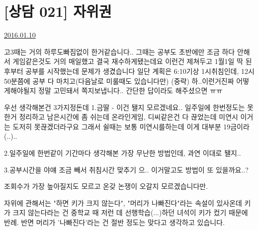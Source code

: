 \section{[상담 021] 자위권}
\href{https://www.kockoc.com/Apoc/583606}{2016.01.10}

\vspace{5mm}

고3때는 거의 하루도빠짐없이 한거같습니다.. 그때는 공부도 초반에만 조금 하다 안해서
게임같은것도 거의 매일했고 결국 재수하게됐는데요
이런건 제쳐두고 1월1일 딱 된 후부터 공부를 시작했는데 문제가 생겼습니다
일단 계획은 6:10기상 1시취침인데, 12시 50분쯤에 공부 다 마치고(다음날로 미룰때도 있습니다만)
(중략)
하..이런거진짜 어떻게해야될지 정말 고민돼서 쪽지보냅니다.. 간단한 답이라도 해주셨으면 ㅠㅠ
\vspace{5mm}

우선 생각해본건 3가지정돈데
1.금딸 - 이건 됄지 모르겠네요.. 일주일에 한번정도는 못한거 정리하고 남은시간에 좀 쉬는데
온라인게임, 디씨같은건 다 끊었는데 미연시 이거는 도저히 못끊겠더라구요
그래서 쉴때는 보통 미연시를하는데 이게 대부분 19금이라(..)..
\vspace{5mm}

2.일주일에 한번같이 기간마다
생각해본 가장 무난한 방법인데, 과연 이대로 됄지..
\vspace{5mm}

3.공부시간을 야얘 조금 빼서 취침시간 맞추기
으.. 이거말고도 방법이 또 있을까요..?
\vspace{5mm}

조회수가 가장 높아질지도 모르고 온갖 논쟁이 오갈지 모르겠습니다만.
\vspace{5mm}

자위에 관해서는 "하면 키가 크지 않는다", "머리가 나빠진다"라는 속설이 있사온데
키가 크지 않는다라는 건 중학교 때 저런 데 선행학습(...)하던 녀석이 키가 컸기 때문에 반례.
반면 머리가 '나빠진다'라는 건 절반 정도는 맞다고 생각하고 있습니다.
\vspace{5mm}

